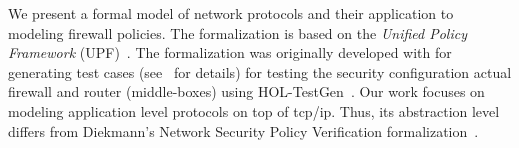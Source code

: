 We present a formal model of network protocols and their application
to modeling firewall policies. The formalization is based on the
\emph{Unified Policy Framework} (UPF)~\cite{brucker.ea:upf:2014}. The
formalization was originally developed with for generating test cases
(see~\cite{brucker.ea:formal-fw-testing:2014} for details) for testing the
security configuration actual firewall and router (middle-boxes) using
HOL-TestGen~\cite{brucker.ea:formal-fw-testing:2014}. Our work focuses
on modeling application level protocols on top of tcp/ip. Thus, its
abstraction level differs from Diekmann's Network Security Policy
Verification
formalization~\cite{Network_Security_Policy_Verification-AFP}.

